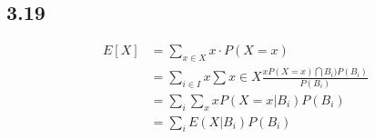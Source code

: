 \documentclass[letterpaper,12pt]{article}
\theoremstyle{definition}
\begin{document}
\subsection*{3.19}


\begin{align*}
    E[X] &= \sum_{x \in X} x \cdot P(X=x) \\
    & = \sum_{i \in I} x \sum{x \in X} \frac{x P(X = x) \bigcap B_i) P(B_i)}{P(B_i)}\\
    & = \sum_i \sum_x x P(X=x|B_i)P(B_i) \\
    & = \sum_i E(X|B_i)P(B_i)
\end{align*}
\end{document}

